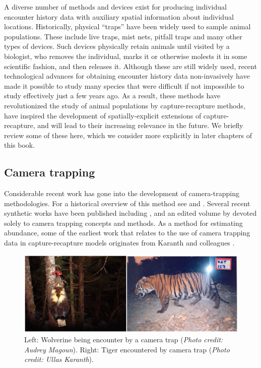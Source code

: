 A diverse number of methods and devices exist for producing individual
encounter history data with auxiliary spatial information about
individual locations. Historically, physical ``traps'' have been
widely used to sample animal populations. These include live traps,
mist nets, pitfall traps and many other types of devices. Such devices
physically retain animals until visited by a biologist, who removes
the individual, marks it or otherwise molests it in some scientific
fashion, and then releases it.  Although these are still widely used,
recent technological advances for obtaining encounter history data
non-invasively have made it possible to study many species that were
difficult if not impossible to study effectively just a few years ago.
As a result, these methods have revolutionized the study of animal
populations by capture-recapture methods, have inspired the
development of spatially-explicit extensions of capture-recapture, and
will lead to their increasing relevance in the future.  We briefly
review some of these here, which we consider more explicitly in later
chapters of this book.

\subsection{Camera trapping}

Considerable recent work has gone into the development of
camera-trapping methodologies. For a historical overview of this
method see \citet{kays_etal:2008} and \citet{kucera_barrett:2011}.
Several recent synthetic works have been published including
\citet{nichols_karanth:2002}, and an edited volume by
\citet{oconnell_etal:2010} devoted solely to camera trapping concepts
and methods. As a method for estimating abundance, some of the
earliest work that relates to the use of camera trapping data in
capture-recapture models originates from Karanth and colleagues
\citep{karanth:1995, karanth_nichols:1998, karanth_nichols:2000}.

\begin{figure}[ht]
\begin{center}
\includegraphics[width=5in]{Ch1/figs/wolverinetiger.png}
\end{center}
\caption{
Left: Wolverine being encounter by a
camera trap ({\it Photo credit: Audrey Magoun}).
Right: Tiger encountered by
camera trap ({\it Photo credit: Ullas Karanth}).
}
\label{fig.wolverinetiger}
\end{figure}

